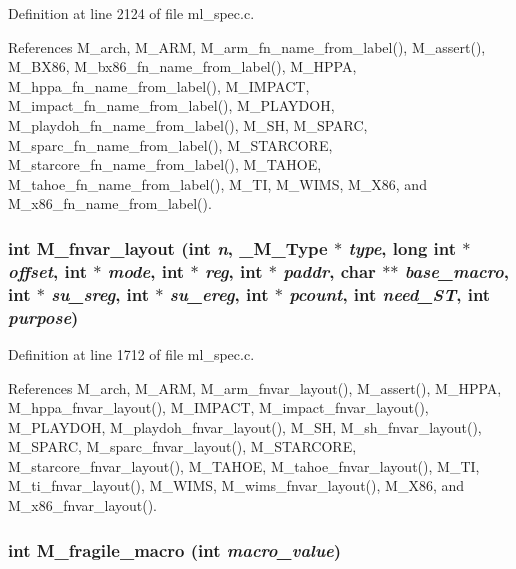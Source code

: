 Definition at line 2124 of file ml\_\-spec.c.

References M\_\-arch, M\_\-ARM, M\_\-arm\_\-fn\_\-name\_\-from\_\-label(), M\_\-assert(), M\_\-BX86, M\_\-bx86\_\-fn\_\-name\_\-from\_\-label(), M\_\-HPPA, M\_\-hppa\_\-fn\_\-name\_\-from\_\-label(), M\_\-IMPACT, M\_\-impact\_\-fn\_\-name\_\-from\_\-label(), M\_\-PLAYDOH, M\_\-playdoh\_\-fn\_\-name\_\-from\_\-label(), M\_\-SH, M\_\-SPARC, M\_\-sparc\_\-fn\_\-name\_\-from\_\-label(), M\_\-STARCORE, M\_\-starcore\_\-fn\_\-name\_\-from\_\-label(), M\_\-TAHOE, M\_\-tahoe\_\-fn\_\-name\_\-from\_\-label(), M\_\-TI, M\_\-WIMS, M\_\-X86, and M\_\-x86\_\-fn\_\-name\_\-from\_\-label().
\subsubsection{\setlength{\rightskip}{0pt plus 5cm}int M\_\-fnvar\_\-layout (int {\em n}, \bf{\_\-M\_\-Type} $\ast$ {\em type}, long int $\ast$ {\em offset}, int $\ast$ {\em mode}, int $\ast$ {\em reg}, int $\ast$ {\em paddr}, char $\ast$$\ast$ {\em base\_\-macro}, int $\ast$ {\em su\_\-sreg}, int $\ast$ {\em su\_\-ereg}, int $\ast$ {\em pcount}, int {\em need\_\-ST}, int {\em purpose})}\label{ml__spec_8c_6acbb2b85cca52fe095e8cff68a2fbf1}




Definition at line 1712 of file ml\_\-spec.c.

References M\_\-arch, M\_\-ARM, M\_\-arm\_\-fnvar\_\-layout(), M\_\-assert(), M\_\-HPPA, M\_\-hppa\_\-fnvar\_\-layout(), M\_\-IMPACT, M\_\-impact\_\-fnvar\_\-layout(), M\_\-PLAYDOH, M\_\-playdoh\_\-fnvar\_\-layout(), M\_\-SH, M\_\-sh\_\-fnvar\_\-layout(), M\_\-SPARC, M\_\-sparc\_\-fnvar\_\-layout(), M\_\-STARCORE, M\_\-starcore\_\-fnvar\_\-layout(), M\_\-TAHOE, M\_\-tahoe\_\-fnvar\_\-layout(), M\_\-TI, M\_\-ti\_\-fnvar\_\-layout(), M\_\-WIMS, M\_\-wims\_\-fnvar\_\-layout(), M\_\-X86, and M\_\-x86\_\-fnvar\_\-layout().
\subsubsection{\setlength{\rightskip}{0pt plus 5cm}int M\_\-fragile\_\-macro (int {\em macro\_\-value})}\label{ml__spec_8c_889a8be69ebae30d0f5af018f747ead4}




